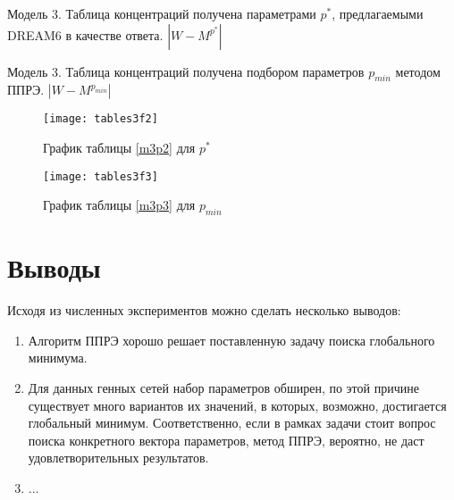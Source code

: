\begin{table}[h]
  \centering
  
  \caption{Модель 3. Таблица концентраций получена параметрами $p^*$, 
  предлагаемыми DREAM6 в качестве ответа. $|W - M^{p^*}|$}
  \label{m3p2}
\end{table}
\begin{table}[h]
  \centering
  
  \caption{Модель 3. Таблица концентраций получена подбором параметров 
  $p_{min}$ методом ППРЭ. $|W - M^{p_{min}}|$}
  \label{m3p3}
\end{table}
\begin{figure}[h]
  \begin{minipage}[h]{0.5\linewidth}
    \texttt{[image: tables3f2]}
    \caption{График таблицы \ref{m3p2} для $p^*$}
  \end{minipage}
  \hfill
  \begin{minipage}[h]{0.5\linewidth}
    \texttt{[image: tables3f3]}
    \caption{График таблицы \ref{m3p3} для $p_{min}$}
  \end{minipage}
\end{figure}

\clearpage
\section{Выводы} \label{s4}

Исходя из численных экспериментов можно сделать несколько выводов:

\begin{enumerate}
  \item Алгоритм ППРЭ хорошо решает поставленную задачу поиска глобального 
  минимума. 
  \item Для данных генных сетей набор параметров обширен, по этой причине 
  существует много вариантов их значений, в которых, возможно, достигается 
  глобальный минимум. Соответственно, если в рамках задачи стоит вопрос поиска 
  конкретного вектора параметров, метод ППРЭ, вероятно, не даст 
  удовлетворительных результатов.
  \item ...
\end{enumerate}


\clearpage

